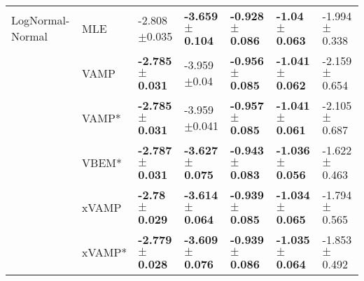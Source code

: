 \begin{tabular}{lllllll}
LogNormal-Normal & MLE &           -2.808$\pm$0.035 &  \textbf{-3.659$\pm$0.104} &  \textbf{-0.928$\pm$0.086} &   \textbf{-1.04$\pm$0.063} &           -1.994$\pm$0.338 \\
                 & VAMP &  \textbf{-2.785$\pm$0.031} &            -3.959$\pm$0.04 &  \textbf{-0.956$\pm$0.085} &  \textbf{-1.041$\pm$0.062} &           -2.159$\pm$0.654 \\
                 & VAMP* &  \textbf{-2.785$\pm$0.031} &           -3.959$\pm$0.041 &  \textbf{-0.957$\pm$0.085} &  \textbf{-1.041$\pm$0.061} &           -2.105$\pm$0.687 \\
                 & VBEM* &  \textbf{-2.787$\pm$0.031} &  \textbf{-3.627$\pm$0.075} &  \textbf{-0.943$\pm$0.083} &  \textbf{-1.036$\pm$0.056} &           -1.622$\pm$0.463 \\
                 & xVAMP &   \textbf{-2.78$\pm$0.029} &  \textbf{-3.614$\pm$0.064} &  \textbf{-0.939$\pm$0.085} &  \textbf{-1.034$\pm$0.065} &           -1.794$\pm$0.565 \\
                 & xVAMP* &  \textbf{-2.779$\pm$0.028} &  \textbf{-3.609$\pm$0.076} &  \textbf{-0.939$\pm$0.086} &  \textbf{-1.035$\pm$0.064} &           -1.853$\pm$0.492 \\
\bottomrule
\end{tabular}

